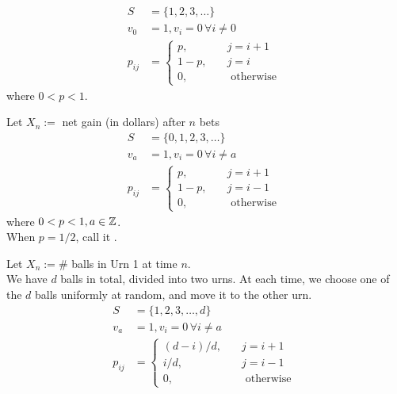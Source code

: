 \documentclass[11pt]{article}
\begin{document}
    \begin{align*}
    	S &= \{1, 2, 3, \hdots \}\\
    	v_{0} &= 1, v_i = 0 \, \forall i \neq 0 \\
    	p_{ij} &= \begin{cases}
    		p, \quad  &j = i + 1\\
    		1 - p, \quad &j = i \\
    		0, \quad &\text{ otherwise }
    	\end{cases}
    \end{align*}
    where $0 < p < 1$.
    
    Let $X_n :=$ net gain (in dollars) after $n$ bets
    \begin{align*}
    	S &= \{0, 1, 2, 3, \hdots \}\\
    	v_{a} &= 1, v_i = 0 \, \forall i \neq a \\
    	p_{ij} &= \begin{cases}
    		p, \quad  &j = i + 1\\
    		1 - p, \quad &j = i - 1 \\
    		0, \quad &\text{ otherwise }
    	\end{cases}
    \end{align*}
    where $0 < p < 1, a \in \mathbb{Z}$. \\
     When $p = 1/2$, call it .
    
    Let $X_n:= \#$ balls in Urn 1 at time $n$.\\
    We have $d$ balls in total, divided into two urns. At each time, we choose one of the $d$ balls uniformly at random, and move it to the other urn.\\ 
    \begin{align*}
    	S &= \{1, 2, 3, \hdots, d \}\\
    	v_{a} &= 1, v_i = 0 \, \forall i \neq a \\
    	p_{ij} &= \begin{cases}
    		(d - i) / d, \quad  &j = i + 1\\
    		i / d, \quad &j = i - 1 \\
    		0, \quad &\text{ otherwise }
    	\end{cases}
    \end{align*}
    
\end{document}
